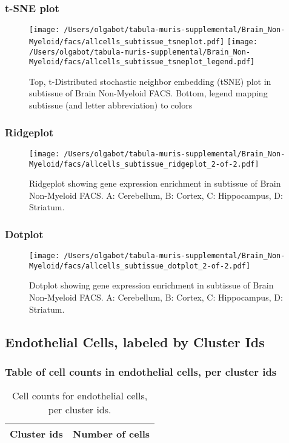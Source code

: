 \newpage
\subsubsection{t-SNE plot}
\begin{figure}[h]
\centering
\texttt{[image: /Users/olgabot/tabula-muris-supplemental/Brain\_Non-Myeloid/facs/allcells\_subtissue\_tsneplot.pdf]}
\texttt{[image: /Users/olgabot/tabula-muris-supplemental/Brain\_Non-Myeloid/facs/allcells\_subtissue\_tsneplot\_legend.pdf]}
\caption{Top, t-Distributed stochastic neighbor embedding (tSNE) plot  in subtissue of Brain Non-Myeloid FACS. Bottom, legend mapping subtissue (and letter abbreviation) to colors}
\end{figure}


\newpage
\newpage
\subsubsection{Ridgeplot}
\begin{figure}[h]
\centering
\texttt{[image: /Users/olgabot/tabula-muris-supplemental/Brain\_Non-Myeloid/facs/allcells\_subtissue\_ridgeplot\_2-of-2.pdf]}

\caption{ Ridgeplot  showing gene expression enrichment in subtissue of Brain Non-Myeloid FACS. A: Cerebellum, B: Cortex, C: Hippocampus, D: Striatum.}
\end{figure}


\newpage
\newpage
\subsubsection{Dotplot}
\begin{figure}[h]
\centering
\texttt{[image: /Users/olgabot/tabula-muris-supplemental/Brain\_Non-Myeloid/facs/allcells\_subtissue\_dotplot\_2-of-2.pdf]}

\caption{ Dotplot  showing gene expression enrichment in subtissue of Brain Non-Myeloid FACS. A: Cerebellum, B: Cortex, C: Hippocampus, D: Striatum.}
\end{figure}


\newpage
\subsection{Endothelial Cells, labeled by Cluster Ids}
\subsubsection{Table of cell counts in endothelial cells, per cluster ids}\begin{table}[h]
\centering
\label{my-label}
\begin{tabular}{@{}ll@{}}
\toprule

Cluster ids& Number of cells \\ \midrule\bottomrule
\end{tabular}
\caption{Cell counts for endothelial cells, per cluster ids.}
\end{table}

